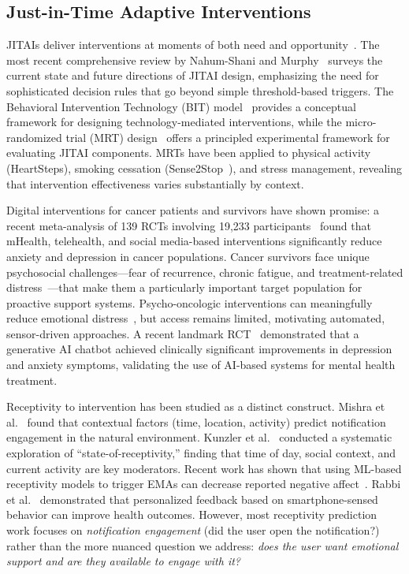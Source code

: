 \documentclass[screen,review,anonymous]{acmart}
\begin{document}
\subsection{Just-in-Time Adaptive Interventions}

JITAIs deliver interventions at moments of both need and opportunity~\cite{nahum2018jitai}. The most recent comprehensive review by Nahum-Shani and Murphy~\cite{nahumshani2026jitai_review} surveys the current state and future directions of JITAI design, emphasizing the need for sophisticated decision rules that go beyond simple threshold-based triggers. The Behavioral Intervention Technology (BIT) model~\cite{mohr2011behavioral_intervention} provides a conceptual framework for designing technology-mediated interventions, while the micro-randomized trial (MRT) design~\cite{klasnja2015mrt} offers a principled experimental framework for evaluating JITAI components. MRTs have been applied to physical activity (HeartSteps), smoking cessation (Sense2Stop~\cite{battalio2021sense2stop}), and stress management, revealing that intervention effectiveness varies substantially by context.

Digital interventions for cancer patients and survivors have shown promise: a recent meta-analysis of 139 RCTs involving 19,233 participants~\cite{digital_cancer_mh2025} found that mHealth, telehealth, and social media-based interventions significantly reduce anxiety and depression in cancer populations. Cancer survivors face unique psychosocial challenges---fear of recurrence, chronic fatigue, and treatment-related distress~\cite{stanton2012cancer_survivorship, linden2012anxiety_cancer, bower2014cancer_fatigue}---that make them a particularly important target population for proactive support systems. Psycho-oncologic interventions can meaningfully reduce emotional distress~\cite{faller2013depression_cancer}, but access remains limited, motivating automated, sensor-driven approaches. A recent landmark RCT~\cite{nejm_ai_chatbot2025} demonstrated that a generative AI chatbot achieved clinically significant improvements in depression and anxiety symptoms, validating the use of AI-based systems for mental health treatment.

Receptivity to intervention has been studied as a distinct construct. Mishra et al.~\cite{mishra2021receptivity} found that contextual factors (time, location, activity) predict notification engagement in the natural environment. Kunzler et al.~\cite{kunzler2019receptivity} conducted a systematic exploration of ``state-of-receptivity,'' finding that time of day, social context, and current activity are key moderators. Recent work has shown that using ML-based receptivity models to trigger EMAs can decrease reported negative affect~\cite{receptivity_affect_ml2024}. Rabbi et al.~\cite{rabbi2015mybehavior} demonstrated that personalized feedback based on smartphone-sensed behavior can improve health outcomes. However, most receptivity prediction work focuses on \emph{notification engagement} (did the user open the notification?) rather than the more nuanced question we address: \emph{does the user want emotional support and are they available to engage with it?}
\end{document}
